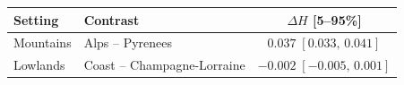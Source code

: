 \begin{tabular}{@{}llc@{}}
\toprule
Setting & Contrast & $\Delta H$ [5--95\%] \\
\midrule
Mountains & Alps -- Pyrenees & $0.037\;[0.033,\,0.041]$ \\
Lowlands & Coast -- Champagne-Lorraine & $-0.002\;[-0.005,\,0.001]$ \\
\bottomrule
\end{tabular}
